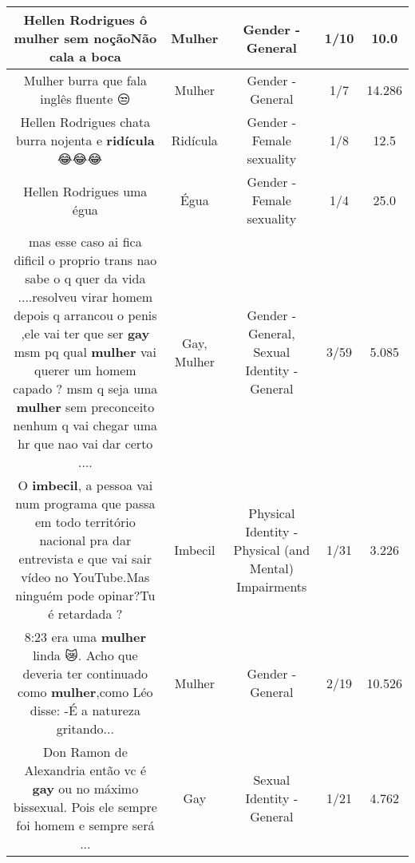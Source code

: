 \documentclass[11pt]{article}
\newlength\mylength
\begin{document}
\begin{center}
\begin{longtable}{|C{.65\mylength}|C{.30\mylength}|C{.12\mylength}|C{.12\mylength}|C{.12\mylength}|}
  \small Hellen Rodrigues ô \textbf{mulher} sem noçãoNão cala a boca\normalsize   & Mulher & Gender - General & 1/10 & 10.0 \\  \hline
  \small Mulher burra que fala inglês fluente 😒\normalsize   & Mulher & Gender - General & 1/7 & 14.286 \\  \hline
  \small Hellen Rodrigues chata burra nojenta e \textbf{ridícula} 😂😂😂💩💩🐂\normalsize   & Ridícula & Gender - Female sexuality & 1/8 & 12.5 \\  \hline
  \small Hellen Rodrigues uma égua\normalsize   & Égua & Gender - Female sexuality & 1/4 & 25.0 \\  \hline
  \small mas esse caso ai fica dificil o proprio trans nao sabe o q quer da vida ....resolveu virar homem depois q arrancou o penis ,ele vai ter que ser \textbf{gay} msm pq qual \textbf{mulher} vai querer um homem capado ? msm q seja uma \textbf{mulher} sem preconceito nenhum q vai chegar uma hr que nao vai dar certo ....\normalsize   & Gay, Mulher & Gender - General, Sexual Identity - General & 3/59 & 5.085 \\  \hline
  \small O \textbf{imbecil}, a pessoa vai num programa que passa em todo território nacional pra dar entrevista e que vai sair vídeo no YouTube.Mas ninguém pode opinar?Tu é retardada ?\normalsize   & Imbecil & Physical Identity - Physical (and Mental) Impairments & 1/31 & 3.226 \\  \hline
  \small 8:23 era uma \textbf{mulher} linda 😿. Acho que deveria ter continuado como \textbf{mulher},como Léo disse: -É a natureza gritando...\normalsize   & Mulher & Gender - General & 2/19 & 10.526 \\  \hline
  \small Don Ramon de Alexandria  então vc é \textbf{gay} ou no máximo bissexual. Pois ele sempre foi homem e sempre será ...\normalsize   & Gay & Sexual Identity - General & 1/21 & 4.762 \\  \hline

\end{longtable}
\end{center}
\end{document}
